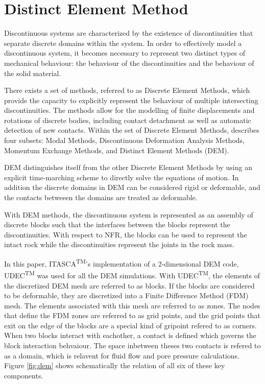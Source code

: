 \section{Distinct Element Method}
Discontinuous systems are characterized by the existence of discontinuities that separate discrete domains within the system. In order to effectively model a discontinuous system, it becomes necessary to represent two distinct types of mechanical behaviour: the behaviour of the discontinuities and the behaviour of the solid material.

There exists a set of methods, referred to as Discrete Element Methods, which provide the capacity to explicitly represent the behaviour of multiple intersecting discontinuities. The methods allow for the modelling of finite displacements and rotations of discrete bodies, including contact detachment as well as automatic detection of new contacts. Within the set of Discrete Element Methods, \citet{CUNDALL_1992} describes four subsets: Modal Methods, Discontinuous Deformation Analysis Methods, Momentum Exchange Methods, and Distinct Element Methods (DEM).

DEM distinguishes itself from the other Discrete Element Methods by using an explicit time-marching scheme to directly solve the equations of motion. In addition the discrete domains in DEM can be considered rigid or deformable, and the contacts betweeen the domains are treated as deformable.  


With DEM methods, the discontinuous system is represented as an assembly of discrete blocks such that the interfaces between the blocks represent the discontinuities. With respect to NFR, the blocks can be used to represent the intact rock while the discontinuities represent the joints in the rock mass.  

In this paper, ITASCA\textsuperscript{TM}'s implementation of a 2-dimensional DEM code, UDEC\textsuperscript{TM} was used for all the DEM simulations. With UDEC\textsuperscript{TM}, the elements of the discretized DEM mesh are referred to as blocks. If the blocks are considered to be deformable, they are discretized into a Finite Difference Method (FDM) mesh. The elements associated with this mesh are referred to as zones. The nodes that define the FDM zones are referred to as grid points, and the grid points that exit on the edge of the blocks are a special kind of gripoint refered to as corners. When two blocks interact with eachother, a contact is defined which governs the block interaction behvaiour. The space inbetween theses two contacts is refered to as a domain, which is relavent for fluid flow and pore pressure calculations. Figure \ref{fig:dem} shows schematically the relation of all six of these key components. 